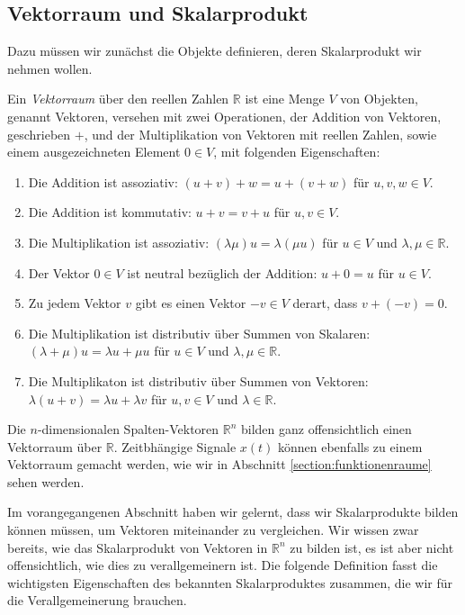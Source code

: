 \subsection{Vektorraum und Skalarprodukt}
Dazu müssen wir zunächst die Objekte definieren, deren Skalarprodukt wir
nehmen wollen.
\begin{definition}
Ein {\em Vektorraum} über den reellen Zahlen $\mathbb R$ ist eine Menge $V$ 
%
von Objekten, genannt Vektoren, versehen mit zwei Operationen, der
Addition von Vektoren, geschrieben $+$, und der Multiplikation von Vektoren
mit reellen Zahlen, sowie einem ausgezeichneten Element $0\in V$, mit
folgenden Eigenschaften:
\begin{enumerate}
\item Die Addition ist assoziativ: $(u+v)+w = u+(v+w)$ für $u,v,w\in V$.
\item Die Addition ist kommutativ: $u+v=v+u$ für $u,v\in V$.
\item Die Multiplikation ist assoziativ: $(\lambda \mu)u=\lambda (\mu u)$ für
$u\in V$ und $\lambda,\mu\in\mathbb R$.
\item Der Vektor $0\in V$ ist neutral bezüglich der Addition: $u+0=u$ für
$u\in V$.
\item Zu jedem Vektor $v$ gibt es einen Vektor $-v\in V$ derart, dass
$v+(-v)=0$.
\item Die Multiplikation ist distributiv über Summen von Skalaren:
$(\lambda + \mu) u = \lambda u + \mu u$ für $u\in V$ und
$\lambda,\mu\in \mathbb R$.
\item Die Multiplikaton ist distributiv über Summen von Vektoren:
$\lambda (u + v) = \lambda u + \lambda v$ für $u,v\in V$ und
$\lambda\in\mathbb R$.
\end{enumerate}
\end{definition}
Die $n$-dimensionalen Spalten-Vektoren $\mathbb R^n$ bilden ganz offensichtlich
einen Vektorraum über $\mathbb R$.
Zeitbhängige Signale $x(t)$ können ebenfalls zu einem Vektorraum gemacht
werden, wie wir in Abschnitt \ref{section:funktionenraume} sehen werden.

Im vorangegangenen Abschnitt haben wir gelernt, dass wir Skalarprodukte
bilden können müssen, um Vektoren miteinander zu vergleichen.
Wir wissen zwar bereits, wie das Skalarprodukt von Vektoren in 
$\mathbb R^n$ zu bilden ist, es ist aber nicht offensichtlich, wie
dies zu verallgemeinern ist.
Die folgende Definition fasst die wichtigsten Eigenschaften des
bekannten Skalarproduktes zusammen, die wir für die Verallgemeinerung
brauchen.

